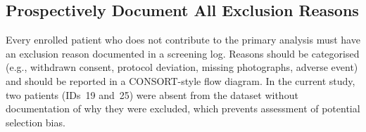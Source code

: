 

\subsection{Prospectively Document All Exclusion Reasons}

Every enrolled patient who does not contribute to the primary analysis must have an exclusion reason documented in a screening log. Reasons should be categorised (e.g., withdrawn consent, protocol deviation, missing photographs, adverse event) and should be reported in a CONSORT-style flow diagram. In the current study, two patients (IDs~19 and~25) were absent from the dataset without documentation of why they were excluded, which prevents assessment of potential selection bias.


%

